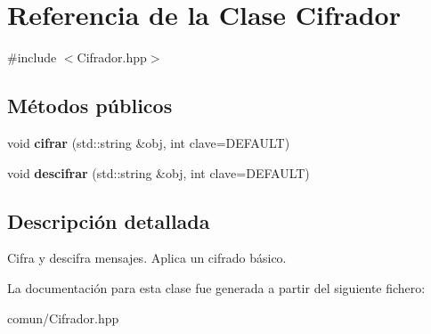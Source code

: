 \hypertarget{classCifrador}{\section{\-Referencia de la \-Clase \-Cifrador}
\label{classCifrador}
}


{\ttfamily \#include $<$\-Cifrador.\-hpp$>$}

\subsection*{\-Métodos públicos}
\begin{DoxyCompactItemize}
\item 
\hypertarget{classCifrador_a539215bcf586cccfc1bcb9f5d3493c4c}{void {\bfseries cifrar} (std\-::string \&obj, int clave=\-D\-E\-F\-A\-U\-L\-T)}\label{classCifrador_a539215bcf586cccfc1bcb9f5d3493c4c}

\item 
\hypertarget{classCifrador_a04cfe0accee25bdfc1dead7cae540b08}{void {\bfseries descifrar} (std\-::string \&obj, int clave=\-D\-E\-F\-A\-U\-L\-T)}\label{classCifrador_a04cfe0accee25bdfc1dead7cae540b08}

\end{DoxyCompactItemize}


\subsection{\-Descripción detallada}
\-Cifra y descifra mensajes. \-Aplica un cifrado básico. 

\-La documentación para esta clase fue generada a partir del siguiente fichero\-:\begin{DoxyCompactItemize}
\item 
comun/\-Cifrador.\-hpp\end{DoxyCompactItemize}
